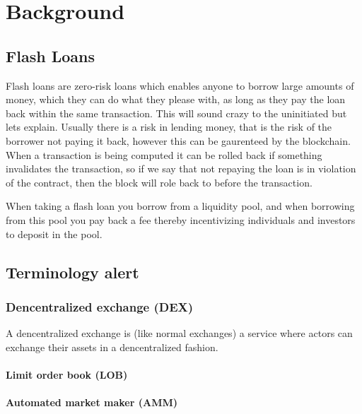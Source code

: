 \section{Background}

\subsection{Flash Loans}
Flash loans are zero-risk loans which enables anyone to borrow large amounts of money, which they can do what they please with, as long as they pay the loan back within the same transaction. This will sound crazy to the uninitiated but lets explain. Usually there is a risk in lending money, that is the risk of the borrower not paying it back, however this can be gaurenteed by the blockchain. When a transaction is being computed it can be rolled back if something invalidates the transaction, so if we say that not repaying the loan is in violation of the contract, then the block will role back to before the transaction.

When taking a flash loan you borrow from a liquidity pool, and when borrowing from this pool you pay back a fee thereby incentivizing individuals and investors to deposit in the pool.

\subsection{Terminology alert}
\subsubsection{Dencentralized exchange (DEX)}
A dencentralized exchange is (like normal exchanges) a service where actors can exchange their assets in a dencentralized fashion.

\paragraph{Limit order book (LOB)}
\paragraph{Automated market maker (AMM)}